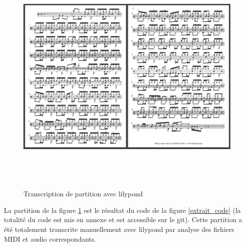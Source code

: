 \begin{figure}[h]
    \includegraphics[height=120mm, width=160mm]{
    z_images/4_experimentations/1_analyses/3_partition.png}
    \caption{Transcription de partition avec lilypond}
	\label{partition_ref}
\end{figure}

La partition de la figure \ref{partition_ref} est le résultat du code de la
figure \ref{extrait_code} (la totalité du code est mis en annexe et est
accessible sur le git). Cette partition a été totalement transcrite
manuellement avec lilypond par analyse des fichiers MIDI et audio
correspondants.

